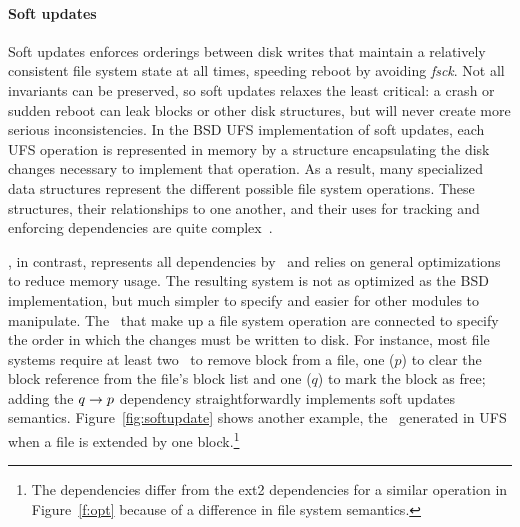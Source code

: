 
\paragraph{Soft updates}
\label{sec:using:softupdate}

%
Soft updates enforces orderings between disk writes that maintain
a relatively consistent file system state at all times, speeding reboot
by avoiding \emph{fsck}.
%
Not all invariants can be preserved, so soft updates relaxes the least
critical: a crash or sudden reboot can leak blocks or other disk
structures, but will never create more serious inconsistencies.
%
%
%
In the BSD UFS implementation of soft updates, each UFS operation is
represented in memory by a structure encapsulating the disk changes
necessary to implement that operation. As a result, many
specialized data structures represent the different possible file system
operations. These structures, their relationships to one another, and their uses
for tracking and enforcing dependencies are quite
complex~\cite{mckusick99soft}.

\Kudos, in contrast, represents all dependencies by \patches\ and relies on
general optimizations to reduce memory usage.
%
The resulting system is not as optimized as the BSD implementation, but
much simpler to specify and easier for other modules to manipulate.
%
The \patches\ that make up a file system operation are connected to specify
the order in which the changes must be written to disk.
%
For instance, most file systems require at least two \patches\ to remove
block from a file, one ($p$) to clear the block reference from the file's
block list and one ($q$) to mark the block as free; adding the $q \rightarrow
p$ dependency straightforwardly implements soft updates semantics.
%
Figure~\ref{fig:softupdate} shows another example, the \patches\ generated in
UFS when a file is extended by one block.\footnote{The dependencies differ
from the ext2 dependencies for a similar operation in Figure~\ref{f:opt}
because of a difference in file system semantics.}

